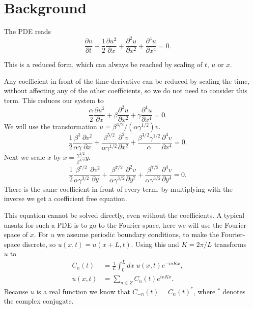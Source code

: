 \section{Background}
The PDE reads~\cite{ruyer-quil2014dynamics}
\begin{equation}
  \frac{\partial u }{\partial t} + \frac{1}{2} \frac{\partial u^2 }{\partial x} + \frac{\partial^2 u }{\partial x^2} + \frac{\partial^4 u }{\partial x^4} = 0.\label{eq:PDE}
\end{equation}

This is a reduced form, which can always be reached by scaling of $t$, $u$ or $x$.

Any coefficient in front of the time-derivative can be reduced by scaling the time, without affecting any of the other coefficients, so we do not need to consider this term. This reduces our system to
\begin{equation}
  \frac{\alpha}{2} \frac{\partial u^2 }{\partial x} + \beta \frac{\partial^2 u }{\partial x^2} + \gamma \frac{\partial^4 u }{\partial x^4} = 0.
\end{equation}
We will use the transformation $ u =\beta^{3/2}/(\alpha \gamma^{1/2}) v $.
\begin{equation}
  \frac{1}{2} \frac{\beta^3}{\alpha \gamma} \frac{\partial v^2 }{\partial x} + \frac{\beta^{5/2}}{\alpha \gamma^{1/2}} \frac{\partial^2 v }{\partial x^2} + \frac{\beta^{3/2} \gamma^{1/2}}{\alpha} \frac{\partial^4 v }{\partial x^4} = 0.
\end{equation}
Next we scale $x$ by $ x = \frac{\gamma^{1/2}}{\beta^{1/2}} y $.
\begin{equation}
  \frac{1}{2} \frac{\beta^{7/2}}{\alpha \gamma^{3/2}} \frac{\partial v^2 }{\partial y} + \frac{\beta^{7/2}}{\alpha \gamma^{3/2}} \frac{\partial^2 v }{\partial y^2} + \frac{\beta^{7/2}}{\alpha \gamma^{3/2}} \frac{\partial^4 v }{\partial y^4} = 0.
\end{equation}
There is the same coefficient in front of every term, by multiplying with the inverse we get a coefficient free equation.

This equation cannot be solved directly, even without the coefficients. A typical ansatz for such a PDE is to go to the Fourier-space, here we will use the Fourier-space of $x$. For $u$ we assume periodic boundary conditions, to make the Fourier-space discrete, so $ u(x, t) = u(x + L, t) $. Using this and $ K = 2 \pi/L $ transforms $u$ to
\begin{align}
  C_n(t) & = \frac{1}{L} \int_0^L dx \; u(x,t) e^{-in K x}, \\
  u(x, t) & = \sum_{n \in Z} C_n (t) e^{in K x}. \label{eq:inverse}
\end{align}
Because $u$ is a real function we know that $C_{-n}(t) = {C_n(t)}^{*}$, where $^*$ denotes the complex conjugate.

